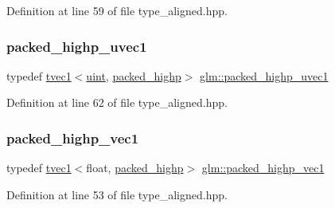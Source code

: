 Definition at line 59 of file type\+\_\+aligned.\+hpp.

\mbox{\label{group__gtc__type__aligned_gaf5761ca585ef8aa7aa85efd0f62c0c39}} 
\subsubsection{\texorpdfstring{packed\_highp\_uvec1}{packed\_highp\_uvec1}}
{\footnotesize\ttfamily typedef \mbox{\hyperlink{structglm_1_1tvec1}{tvec1}}$<$\mbox{\hyperlink{group__core__precision_ga4fd29415871152bfb5abd588334147c8}{uint}}, \mbox{\hyperlink{namespaceglm_a0f04f086094c747d227af4425893f545a8e8791ee77fe079b1291f710d88031bf}{packed\+\_\+highp}}$>$ \mbox{\hyperlink{group__gtc__type__aligned_gaf5761ca585ef8aa7aa85efd0f62c0c39}{glm\+::packed\+\_\+highp\+\_\+uvec1}}}



Definition at line 62 of file type\+\_\+aligned.\+hpp.

\mbox{\label{group__gtc__type__aligned_ga8514bab94f23d24c7655949bb44797a6}} 
\subsubsection{\texorpdfstring{packed\_highp\_vec1}{packed\_highp\_vec1}}
{\footnotesize\ttfamily typedef \mbox{\hyperlink{structglm_1_1tvec1}{tvec1}}$<$float, \mbox{\hyperlink{namespaceglm_a0f04f086094c747d227af4425893f545a8e8791ee77fe079b1291f710d88031bf}{packed\+\_\+highp}}$>$ \mbox{\hyperlink{group__gtc__type__aligned_ga8514bab94f23d24c7655949bb44797a6}{glm\+::packed\+\_\+highp\+\_\+vec1}}}



Definition at line 53 of file type\+\_\+aligned.\+hpp.

\mbox{\label{group__gtc__type__aligned_ga4b803db802aa82cc46d17120e786de1d}} 
